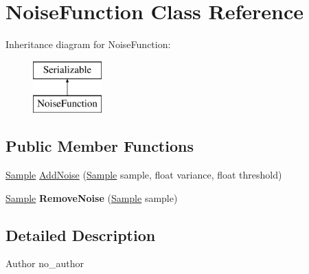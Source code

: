 \hypertarget{classNoiseFunction}{\section{Noise\-Function Class Reference}
\label{classNoiseFunction}
}
Inheritance diagram for Noise\-Function\-:\begin{figure}[H]
\begin{center}
\leavevmode
\includegraphics[height=2.000000cm]{classNoiseFunction}
\end{center}
\end{figure}
\subsection*{Public Member Functions}
\begin{DoxyCompactItemize}
\item 
\hyperlink{classSample}{Sample} \hyperlink{classNoiseFunction_a990650302a923a44f1c3504f1724628d}{Add\-Noise} (\hyperlink{classSample}{Sample} sample, float variance, float threshold)
\item 
\hypertarget{classNoiseFunction_a82388ad54f20613f9575d68f07dbc4a2}{\hyperlink{classSample}{Sample} {\bfseries Remove\-Noise} (\hyperlink{classSample}{Sample} sample)}\label{classNoiseFunction_a82388ad54f20613f9575d68f07dbc4a2}

\end{DoxyCompactItemize}


\subsection{Detailed Description}
\begin{DoxyAuthor}{Author}
no\-\_\-author 
\end{DoxyAuthor}


